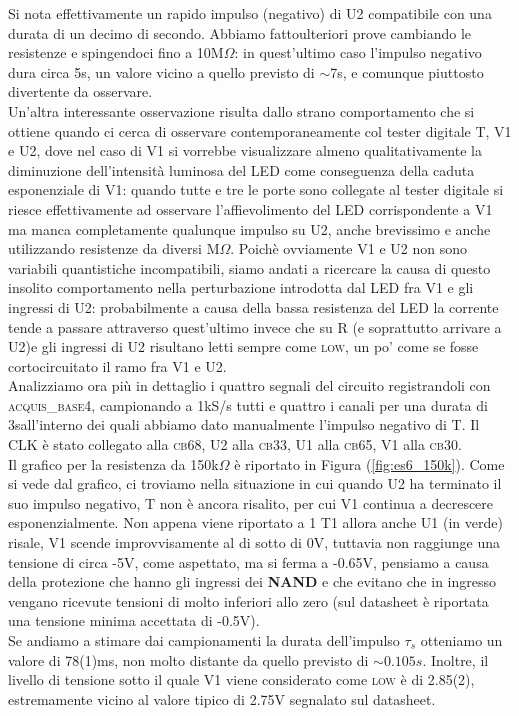 \documentclass[journal, a4paper]{IEEEtran}
\begin{document}
Si nota effettivamente un rapido impulso (negativo) di U2 compatibile con una durata di un decimo di secondo. Abbiamo fattoulteriori prove cambiando le resistenze e spingendoci fino a 10M$\Omega$: in quest'ultimo caso l'impulso negativo dura circa 5s, un valore vicino a quello previsto di $\sim$7s, e comunque piuttosto divertente da osservare. \\
Un'altra interessante osservazione risulta dallo strano comportamento che si ottiene quando ci cerca di osservare contemporaneamente col tester digitale T, V1 e U2, dove nel caso di V1 si vorrebbe visualizzare almeno qualitativamente la diminuzione dell'intensità luminosa del LED come conseguenza della caduta esponenziale di V1: quando tutte e tre le porte sono collegate al tester digitale si riesce effettivamente ad osservare l'affievolimento del LED corrispondente a V1 ma manca completamente qualunque impulso su U2, anche brevissimo e anche utilizzando resistenze da diversi M$\Omega$. Poichè ovviamente V1 e U2 non sono variabili quantistiche incompatibili, siamo andati a ricercare la causa di questo insolito comportamento nella perturbazione introdotta dal LED fra V1 e gli ingressi di U2: probabilmente a causa della bassa resistenza del LED la corrente tende a passare attraverso quest'ultimo invece che su R (e soprattutto arrivare a U2)e gli ingressi di U2 risultano letti sempre come \textsc{low}, un po' come se fosse cortocircuitato il ramo fra V1 e U2.\\

Analizziamo ora più in dettaglio i quattro segnali del circuito registrandoli con \textsc{acquis\_base4}, campionando a 1kS/s tutti e quattro i canali per una durata di 3sall'interno dei quali abbiamo dato manualmente l'impulso negativo di T. Il \textsc{CLK} è stato collegato alla \textsc{cb68}, U2 alla \textsc{cb33}, U1 alla \textsc{cb65}, V1 alla \textsc{cb30}.\\
Il grafico per la resistenza da 150k$\Omega$ è riportato in Figura (\ref{fig:es6_150k}). Come si vede dal grafico, ci troviamo nella situazione in cui quando U2 ha terminato il suo impulso negativo, T non è ancora risalito, per cui V1 continua a decrescere esponenzialmente. Non appena viene riportato a 1 T1 allora anche U1 (in verde) risale, V1 scende improvvisamente al di sotto di 0V, tuttavia non raggiunge una tensione di circa -5V, come aspettato, ma si ferma a -0.65V, pensiamo a causa della protezione che hanno gli ingressi dei \textbf{NAND} e che evitano che in ingresso vengano ricevute tensioni di molto inferiori allo zero (sul datasheet è riportata una tensione minima accettata di -0.5V).\\
Se andiamo a stimare dai campionamenti la durata dell'impulso $\tau_s$ otteniamo un valore di 78(1)ms, non molto distante da quello previsto di $\sim 0.105s$. Inoltre, il livello di tensione sotto il quale V1 viene considerato come \textsc{low} è di 2.85(2), estremamente vicino al valore tipico di 2.75V segnalato sul datasheet.
\end{document}
